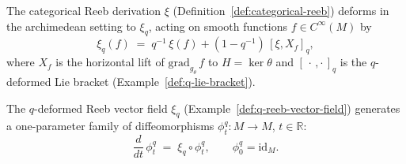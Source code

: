 \begin{example}
\label{def:q-reeb-vector-field}
\leanok
The categorical Reeb derivation $\xi$
(Definition~\ref{def:categorical-reeb}) deforms in the archimedean
setting to $\xi_q$, acting on smooth functions $f \in C^\infty(M)$ by
\[
  \xi_q(f) \;=\; q^{-1}\,\xi(f) + (1 - q^{-1})\,[\xi, X_f]_q,
\]
where $X_f$ is the horizontal lift of $\mathrm{grad}_{g_\theta}\,f$ to
$H = \ker\theta$ and $[\,\cdot\,,\cdot\,]_q$ is the $q$-deformed Lie
bracket (Example~\ref{def:q-lie-bracket}).
\end{example}

\begin{example}
\label{def:q-reeb-flow}
\leanok
The $q$-deformed Reeb vector field $\xi_q$
(Example~\ref{def:q-reeb-vector-field}) generates a one-parameter
family of diffeomorphisms
$\phi_t^q \colon M \to M$, $t \in \mathbb{R}$:
\[
  \frac{d}{dt}\,\phi_t^q \;=\; \xi_q \circ \phi_t^q,
  \qquad \phi_0^q = \mathrm{id}_M.
\]
\end{example}

